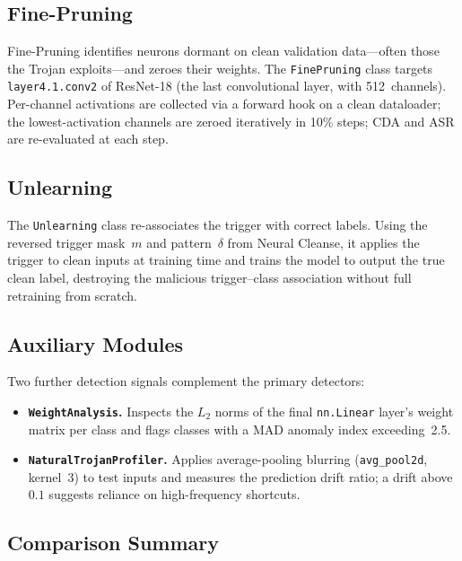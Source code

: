 \documentclass[12pt, letterpaper]{article}
\begin{document}
\subsection{Fine-Pruning~\cite{liu2018fine}}

Fine-Pruning identifies neurons dormant on clean validation data---often those
the Trojan exploits---and zeroes their weights.  The \texttt{FinePruning}
class targets \texttt{layer4.1.conv2} of ResNet-18 (the last convolutional
layer, with 512~channels).  Per-channel activations are collected via a
forward hook on a clean dataloader; the lowest-activation channels are zeroed
iteratively in 10\% steps; CDA and ASR are re-evaluated at each step.

\subsection{Unlearning}

The \texttt{Unlearning} class re-associates the trigger with correct labels.
Using the reversed trigger mask~$m$ and pattern~$\delta$ from Neural Cleanse,
it applies the trigger to clean inputs at training time and trains the model
to output the true clean label, destroying the malicious trigger--class
association without full retraining from scratch.

\subsection{Auxiliary Modules}

Two further detection signals complement the primary detectors:

\begin{itemize}
  \item \textbf{\texttt{WeightAnalysis}.}  Inspects the $L_2$ norms of the
        final \texttt{nn.Linear} layer's weight matrix per class and flags
        classes with a MAD anomaly index exceeding~2.5.
  \item \textbf{\texttt{NaturalTrojanProfiler}.}  Applies average-pooling
        blurring (\texttt{avg\_pool2d}, kernel~3) to test inputs and measures
        the prediction drift ratio; a drift above~$0.1$ suggests reliance on
        high-frequency shortcuts.
\end{itemize}

\FloatBarrier
\subsection{Comparison Summary}
\label{subsec:lit-comparison}
\end{document}
